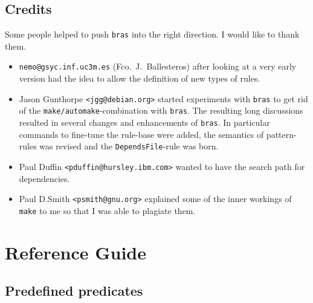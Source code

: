 \documentclass[11pt,bibtotoc,idxtotoc]{scrreprt}
\newcommand{\bras}{\texttt{bras}}
\newcommand{\make}{\texttt{make}}
\begin{document}
\section{Credits}

Some people helped to push \bras{} into the right direction. I
would like to thank them. 

\begin{itemize}
\item \texttt{nemo@gsyc.inf.uc3m.es} (Fco.\ J.~Ballesteros) after
looking at a very early version had the
idea to allow the definition of new types of rules.

\item Jason Gunthorpe \texttt{<jgg@debian.org>} started experiments
  with \bras{} to get rid of the \texttt{make/automake}-combination
  with \bras{}. The resulting long discussions resulted in several
  changes and enhancements of \bras{}. In particular commands to
  fine-tune the rule-base were added, the semantics of pattern-rules
  was revised and the \texttt{DependsFile}-rule was born.
  
\item Paul Duffin \texttt{<pduffin@hursley.ibm.com>} wanted to have
  the search path for dependencies.
  
\item Paul D.Smith \texttt{<psmith@gnu.org>} explained some of the
  inner workings of \make{} to me so that I was able to plagiate them.
\end{itemize}

\chapter{Reference Guide}

\newcommand{\Tt}[1]{\texttt{#1}}
\newcommand{\It}[1]{\textit{#1}}
\newcommand{\Flash}[1]{\fbox{\bfseries #1}}
\newcommand{\Sflabel}[1]{%
  \parbox[b]{\labelwidth}{%
    \makebox[1pt][l]{\textsf{\bfseries#1:}}\\\strut}}
  
\newenvironment{Describe}
{\vskip0pt plus2cm\begin{list}{}{\renewcommand{\makelabel}{\Sflabel}}}
{\end{list}\pagebreak[2]}

\section{Predefined predicates}
\label{sec:predicates}
\end{document}
